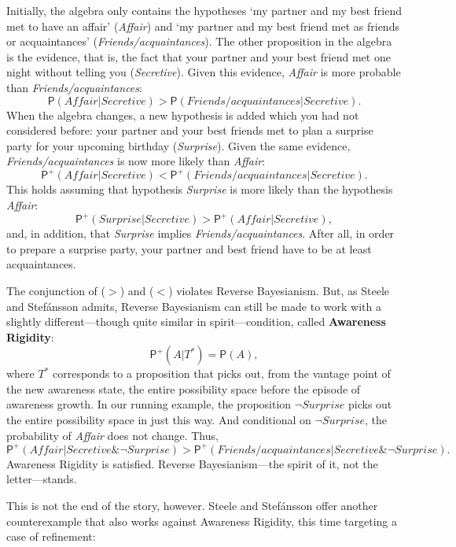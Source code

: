 \documentclass[
  11pt,
  dvipsnames,enabledeprecatedfontcommands]{scrartcl}
\newcommand{\pr}[1]{\ensuremath{\mathsf{P}(#1)}}
\newcommand{\ppr}[2]{\ensuremath{\mathsf{P}^{#1}(#2)}}
\begin{document}
\noindent Initially, the algebra only contains the hypotheses `my
partner and my best friend met to have an affair' (\textit{Affair}) and
`my partner and my best friend met as friends or acquaintances'
(\textit{Friends/acquaintances}). The other proposition in the algebra
is the evidence, that is, the fact that your partner and your best
friend met one night without telling you (\textit{Secretive}). Given
this evidence, \textit{Affair} is more probable than
\textit{Friends/acquaintances}:
\[\pr{\textit{Affair} \vert  \textit{Secretive} }> \pr{\textit{Friends/acquaintances} \vert \textit{Secretive}} \tag{>}.\]
When the algebra changes, a new hypothesis is added which you had not
considered before: your partner and your best friends met to plan a
surprise party for your upcoming birthday (\textit{Surprise}). Given the
same evidence, \textit{Friends/acquaintances} is now more likely than
\textit{Affair}:
\[\ppr{+}{\textit{Affair} \vert  \textit{Secretive} } < \ppr{+}{\textit{Friends/acquaintances} \vert \textit{Secretive}}. \tag{<}\]
This holds assuming that hypothesis \textit{Surprise} is more likely
than the hypothesis \textit{Affair}:
\[\ppr{+}{ \textit{Surprise} \vert \textit{Secretive}}> \ppr{+}{ \textit{Affair} \vert \textit{Secretive}},\]
and, in addition, that \textit{Surprise} implies
\textit{Friends/acquaintances}. After all, in order to prepare a
surprise party, your partner and best friend have to be at least
acquaintances.

The conjunction of (\(>\)) and (\(<\)) violates Reverse Bayesianism.
But, as Steele and Stefánsson admits, Reverse Bayesianism can still be
made to work with a slightly different---though quite similar in
spirit---condition, called \textbf{Awareness Rigidity}:
\[\ppr{+}{A \vert T^*}=\pr{A},\] where \(T^*\) corresponds to a
proposition that picks out, from the vantage point of the new awareness
state, the entire possibility space before the episode of awareness
growth. In our running example, the proposition
\(\neg\textit{Surprise}\) picks out the entire possibility space in just
this way. And conditional on \(\neg\textit{Surprise}\), the probability
of \textit{Affair} does not change. Thus,
\[\ppr{+}{\textit{Affair} \vert  \textit{Secretive} \& \neg\textit{Surprise} } > \ppr{+}{\textit{Friends/acquaintances} \vert \textit{Secretive} \& \neg\textit{Surprise}}. \]
Awareness Rigidity is satisfied. Reverse Bayesianism---the spirit of it,
not the letter---stands.

This is not the end of the story, however. Steele and Stefánsson offer
another counterexample that also works against Awareness Rigidity, this
time targeting a case of refinement:
\end{document}
